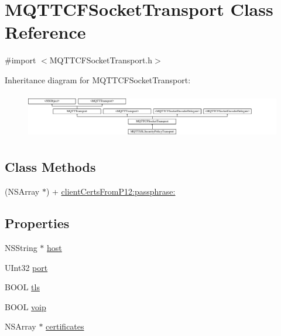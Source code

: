 \hypertarget{interface_m_q_t_t_c_f_socket_transport}{}\section{M\+Q\+T\+T\+C\+F\+Socket\+Transport Class Reference}
\label{interface_m_q_t_t_c_f_socket_transport}


{\ttfamily \#import $<$M\+Q\+T\+T\+C\+F\+Socket\+Transport.\+h$>$}

Inheritance diagram for M\+Q\+T\+T\+C\+F\+Socket\+Transport\+:\begin{figure}[H]
\begin{center}
\leavevmode
\includegraphics[height=2.008969cm]{interface_m_q_t_t_c_f_socket_transport}
\end{center}
\end{figure}
\subsection*{Class Methods}
\begin{DoxyCompactItemize}
\item 
(N\+S\+Array $\ast$) + \hyperlink{interface_m_q_t_t_c_f_socket_transport_ad16ebe588f4117e04f908e59935f096a}{client\+Certs\+From\+P12\+:passphrase\+:}
\end{DoxyCompactItemize}
\subsection*{Properties}
\begin{DoxyCompactItemize}
\item 
N\+S\+String $\ast$ \hyperlink{interface_m_q_t_t_c_f_socket_transport_ae30997b61a8be6b11bf3bb33cf751995}{host}
\item 
U\+Int32 \hyperlink{interface_m_q_t_t_c_f_socket_transport_a834c05604814188efb4f11a12a4b93c1}{port}
\item 
B\+O\+OL \hyperlink{interface_m_q_t_t_c_f_socket_transport_ac0c5a60636d7561abf1d20caddf6ea96}{tls}
\item 
B\+O\+OL \hyperlink{interface_m_q_t_t_c_f_socket_transport_a93ad817080f804937ad2bfd7d4db2b8b}{voip}
\item 
N\+S\+Array $\ast$ \hyperlink{interface_m_q_t_t_c_f_socket_transport_a6e71885e479e6bc28e00f6657fe77205}{certificates}
\end{DoxyCompactItemize}


